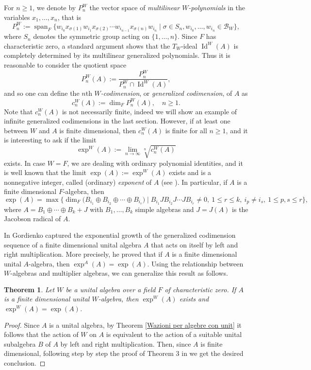 \documentclass[reqno]{amsart}
\newtheorem{theorem}{Theorem}
\theoremstyle{definition}
\numberwithin{equation}{section}
\numberwithin{theorem}{section}
\DeclareMathOperator{\spa}{span}
\DeclareMathOperator{\I}{Id}
\begin{document}
For $n\geq 1$, we denote by $P_n^W$ the vector space of \emph{multilinear $W$-polynomials} in the variables $x_{1},\dots,x_{n}$, that is
    $$
	P_n^W:=\spa_F\{w_{i_0}x_{\sigma(1)}w_{i_1} x_{\sigma(2)}\cdots w_{i_{n-1}}x_{\sigma(n)}w_{i_{n}} \mid \sigma\in S_{n} ,w_{i_0},\ldots,w_{i_{n}}\in \mathcal{B}_W \},
	$$
	where $S_n$ denotes the symmetric group acting on $\{1,\ldots,n\}$.
	Since $F$ has characteristic zero, a standard argument shows that the $T_W$-ideal $\I^W(A)$ is completely determined by its multilinear generalized polynomials. 
	Thus it is reasonable to consider the quotient space
	$$
	P_n^W(A):= \dfrac{P_n^W}{P_n^W \cap \I^W(A)},
	$$
    and so one can define the $n$th \emph{$W$-codimension}, or \emph{generalized codimension}, of $A$ as
    $$
    c_n^W(A):=\dim_F P_n^W(A), \quad n\geq 1.
    $$
 Note that $c_n^W(A)$ is not necessarily finite, indeed we will show an example of infinite generalized codimensions in the last section. However, if at least one between $W$ and $A$ is finite dimensional, then $c_n^W(A)$ is finite for all $n \geq 1$, and it is interesting to ask if the limit 
$$
\exp^W(A):=\lim_{n\to \infty} \sqrt[n]{ c_n^W(A)}
$$
exists. 
 In case $W=F$, we are dealing with ordinary polynomial identities, and it is well known that the limit $\exp(A):=\exp^W(A)$ exists and is a nonnegative integer, called (ordinary) \emph{exponent} of $A$ (see \cite{GiambrunoZaicev1998, GiambrunoZaicev1999}).  In particular, if $A$ is a finite dimensional $F$-algebra, then
  \begin{equation*}
      \exp(A)=\max\{ \dim_F\big( B_{i_1} \oplus B_{i_2}\oplus \cdots \oplus B_{i_r} \big) \mid B_{i_1}J B_{i_2} J \cdots J B_{i_r}\neq 0,  \ 1\leq r \leq k, \ i_p \neq i_s,\ 1\leq p,s\leq r\},
  \end{equation*}
where $A = B_1 \oplus \cdots \oplus B_k + J$ with $B_1, \ldots, B_k$ simple algebras and $J = J(A)$ is the Jacobson radical of $A$.


  In \cite{Gordienko2010} Gordienko captured the exponential growth of the generalized codimension sequence of a finite dimensional unital algebra  $A$ that acts on itself by left and right multiplication. More precisely, he proved that if $A$ is a finite dimensional unital $A$-algebra, then $\exp^A(A)=\exp(A)$. 
Using the relationship between $W$-algebras and multiplier algebras, we can generalize this result as follows.

\begin{theorem}\label{thm: exponent}
   Let  $W$ be a unital algebra over a field $F$ of characteristic zero. If $A$ is a finite dimensional unital $W$-algebra,  then $\exp^W(A)$ exists and $\exp^W(A)=\exp(A)$.
\end{theorem}
\begin{proof}
    Since $A$ is a unital algebra, by Theorem \ref{Wazioni per algebre con unit} it follows that the action of $W$ on $A$ is equivalent to the action of a suitable unital subalgebra $B$ of $A$ by left and right multiplication. Then, since $A$ is finite dimensional, following step by step the proof of Theorem 3 in \cite{Gordienko2010} we get the desired conclusion.
\end{proof}
\end{document}
